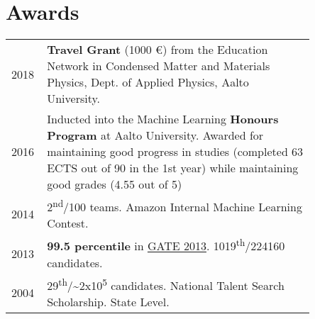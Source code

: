 \documentclass[]{deedy-resume}
\begin{document}
\begin{minipage}[t]{0.62\textwidth}
\section{Awards} 
\begin{tabular}{p{0.05\linewidth}p{0.8\linewidth}}
	2018 & \textbf{Travel Grant} (1000 €) from the Education Network in Condensed Matter and Materials Physics, Dept. of Applied Physics, Aalto University.\\
    2016  & Inducted into the Machine Learning \textbf{Honours Program} at Aalto University. Awarded for maintaining good progress in studies (completed 63 ECTS out of 90 in the 1st year) while maintaining good grades (4.55 out of 5)\\ 
2014  & 2\textsuperscript{nd}/100 teams. Amazon Internal Machine Learning Contest. \\%
2013  & \textbf{99.5 percentile}  in \href{http://www.gate.iitb.ac.in/gate2013/cs-syllabus/}{GATE 2013}. 1019\textsuperscript{th}/224160 candidates.\\
2004  & 29\textsuperscript{th}/\textasciitilde2x10\textsuperscript{5} candidates. National Talent Search Scholarship. State Level.\\

\end{tabular}
\sectionsep


% 



\end{minipage} 
\end{document}

